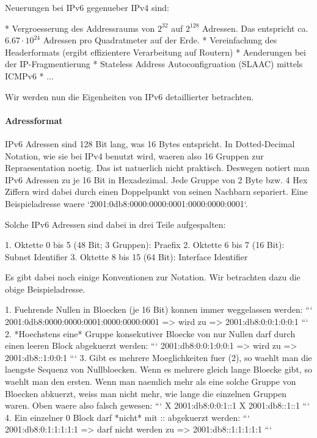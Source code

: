 Neuerungen bei IPv6 gegenueber IPv4 sind:

* Vergroesserung des Addressraums von $2^{32}$ auf $2^{128}$ Adressen. Das
  entspricht ca. $6.67 \cdot 10^{24}$ Adressen pro Quadratmeter auf der Erde.
* Vereinfachung des Headerformats (ergibt effizientere Verarbeitung auf Routern)
* Aenderungen bei der IP-Fragmentierung
* Stateless Address Autoconfigruation (SLAAC) mittels ICMPv6
* ...

Wir werden nun die Eigenheiten von IPv6 detaillierter betrachten.

\paragraph{Adressformat} 

IPv6 Adressen sind 128 Bit lang, was 16 Bytes entspricht. In Dotted-Decimal
Notation, wie sie bei IPv4 benutzt wird, waeren also 16 Gruppen zur
Repraesentation noetig. Das ist natuerlich nicht praktisch. Deswegen notiert man
IPv6 Adressen zu je 16 Bit in Hexadezimal. Jede Gruppe von 2 Byte bzw. 4 Hex
Ziffern wird dabei durch einen Doppelpunkt von seinen Nachbarn separiert. Eine
Beispieladresse waere `2001:0db8:0000:0000:0001:0000:0000:0001`.

Solche IPv6 Adressen sind dabei in drei Teile aufgespalten:

1. Oktette 0 bis 5 (48 Bit; 3 Gruppen): Praefix
2. Oktette 6 bis 7 (16 Bit): Subnet Identifier
3. Oktette 8 bis 15 (64 Bit): Interface Identifier

Es gibt dabei noch einige Konventionen zur Notation. Wir betrachten dazu die
obige Beispieladresse.

1. Fuehrende Nullen in Bloecken (je 16 Bit) konnen immer weggelassen werden:
  ```
  2001:0db8:0000:0000:0001:0000:0000:0001 => wird zu =>
  2001:db8:0:0:1:0:0:1
  ```
2. *Hoechstens eine* Gruppe konsekutiver Bloecke von nur Nullen darf durch einen
  leeren Block abgekuerzt werden:
  ```
  2001:db8:0:0:1:0:0:1 => wird zu =>
  2001:db8::1:0:0:1
  ```
3. Gibt es mehrere Moeglichkeiten fuer (2), so waehlt man die laengste Sequenz
   von Nullbloecken. Wenn es mehrere gleich lange Bloecke gibt, so waehlt man
   den ersten. Wenn man naemlich mehr als eine solche Gruppe von Bloecken
   abkuerzt, weiss man nicht mehr, wie lange die einzelnen Gruppen waren.
   Oben waere also falsch gewesen:
   ```
   X 2001:db8:0:0:1::1
   X 2001:db8::1::1
   ```
4. Ein einzelner 0 Block darf *nicht* mit :: abgekuerzt werden:
   ```
   2001:db8:0:1:1:1:1:1 => darf nicht werden zu =>
   2001:db8::1:1:1:1:1
   ```

